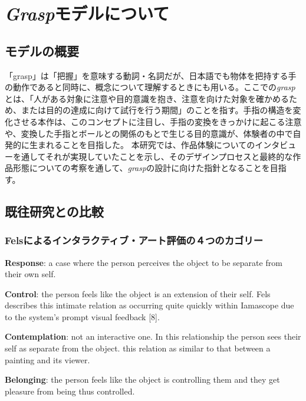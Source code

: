 \chapter{\textit{Grasp}モデルについて}
\section{モデルの概要}
「grasp」は「把握」を意味する動詞・名詞だが、日本語でも物体を把持する手の動作であると同時に、概念について理解するときにも用いる。ここでの\textit{grasp}とは、「人がある対象に注意や目的意識を抱き、注意を向けた対象を確かめるため、または目的の達成に向けて試行を行う期間」のことを指す。手指の構造を変化させる本作は、このコンセプトに注目し、手指の変換をきっかけに起こる注意や、変換した手指とボールとの関係のもとで生じる目的意識が、体験者の中で自発的に生まれることを目指した。
本研究では、作品体験についてのインタビューを通してそれが実現していたことを示し、そのデザインプロセスと最終的な作品形態についての考察を通して、\textit{grasp}の設計に向けた指針となることを目指す。
\section{既往研究との比較}
\subsection{Felsによるインタラクティブ・アート評価の４つのカゴリー}
\textbf{Response}: a case where the person perceives the object to be separate from their own self. 

\textbf{Control}: the person feels like the object is an extension of their self. Fels describes this intimate
relation as occurring quite quickly within Iamascope due to the system’s prompt visual feedback [8].

\textbf{Contemplation}: not an interactive one. In this relationship the person sees their self as separate from the object. this relation as similar to that between a painting and its viewer.

\textbf{Belonging}: the person feels like the object is controlling them and they get pleasure from being thus controlled.